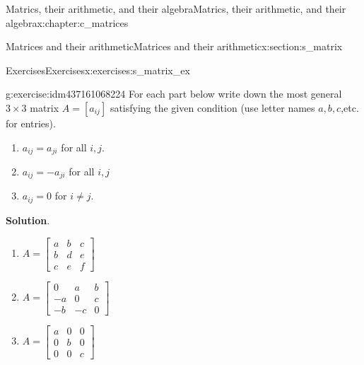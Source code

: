 \documentclass[oneside,10pt,]{book}
\newcommand{\blocktitlefont}{\relax}
\numberwithin{equation}{section}
\newcommand{\amp}{&}
\begin{document}
\begin{chapterptx}{Matrics, their arithmetic, and their algebra}{}{Matrics, their arithmetic, and their algebra}{}{}{x:chapter:c_matrices}
%
%
\typeout{************************************************}
\typeout{************************************************}
%
\begin{sectionptx}{Matrices and their arithmetic}{}{Matrices and their arithmetic}{}{}{x:section:s_matrix}
%
%
\typeout{************************************************}
\typeout{************************************************}
%
\begin{exercises-subsection-numberless}{Exercises}{}{Exercises}{}{}{x:exercises:s_matrix_ex}
\begin{divisionexercise}{1}{}{}{g:exercise:idm437161068224}%
For each part below write down the most general \(3\times 3\) matrix \(A=[a_{ij}]\) satisfying the given condition (use letter names \(a,b,c\),etc. for entries).%
%
\begin{enumerate}[marker=(\alph*)]
\item{}\(a_{ij}=a_{ji}\) for all \(i,j\).%
\item{}\(a_{ij}=-a_{ji}\) for all \(i,j\)%
\item{}\(a_{ij}=0\) for \(i\ne j\).%
\end{enumerate}
\par\smallskip%
\noindent\textbf{\blocktitlefont Solution}.\hypertarget{g:solution:idm437161066368}{}\quad{}%
\begin{enumerate}[marker=(\alph*)]
\item{}\(\displaystyle A=\begin{bmatrix}a\amp b\amp c\\ b\amp d\amp e\\ c\amp e\amp f \end{bmatrix}\)%
\item{}\(\displaystyle A=\begin{bmatrix}0\amp a\amp b\\ -a\amp 0\amp c\\ -b\amp -c\amp 0 \end{bmatrix}\)%
\item{}\(\displaystyle A=\begin{bmatrix}a\amp 0\amp 0\\ 0\amp b\amp 0\\ 0\amp 0\amp c \end{bmatrix}\)%
\end{enumerate}

\end{divisionexercise}
\end{exercises-subsection-numberless}
\end{sectionptx}
\end{chapterptx}
\end{document}
